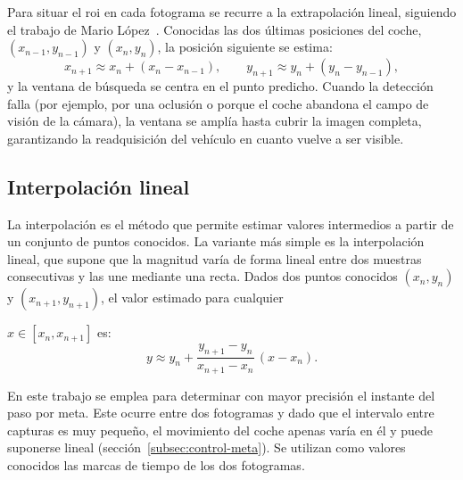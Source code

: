 Para situar el \gls{roi} en cada fotograma se recurre a la extrapolación lineal, siguiendo el trabajo de Mario López~\cite{tfgmario}. Conocidas las dos últimas posiciones del coche, $(x_{n-1}, y_{n-1})$ y $(x_n, y_n)$, la posición siguiente se estima:
\[
    x_{n+1} \approx x_n + (x_n - x_{n-1}), \qquad
    y_{n+1} \approx y_n + (y_n - y_{n-1}),
\] y la ventana de búsqueda se centra en el punto predicho. Cuando la detección falla (por ejemplo, por una oclusión o porque el coche abandona el campo de visión de la cámara), la ventana se amplía hasta cubrir la imagen completa, garantizando la readquisición del vehículo en cuanto vuelve a ser visible.

\subsection{Interpolación lineal}
\label{sec:interpolacion}

La interpolación es el método que permite estimar valores intermedios a partir de un conjunto de puntos conocidos. La variante más simple es la interpolación lineal, que supone que la magnitud varía de forma lineal entre dos muestras consecutivas y las une mediante una recta. Dados dos puntos conocidos $(x_n, y_n)$ y $(x_{n+1}, y_{n+1})$, el valor estimado para cualquier

$x \in [x_n, x_{n+1}]$ es:
\[
    y \approx y_n + \frac{y_{n+1} - y_n}{x_{n+1} - x_n}\,(x - x_n).
\]

En este trabajo se emplea para determinar con mayor precisión el instante del paso por meta. Este ocurre entre dos fotogramas y dado que el intervalo entre capturas es muy pequeño, el movimiento del coche apenas varía en él y puede suponerse lineal (sección~\ref{subsec:control-meta}). Se utilizan como valores conocidos las marcas de tiempo de los dos fotogramas.

%

